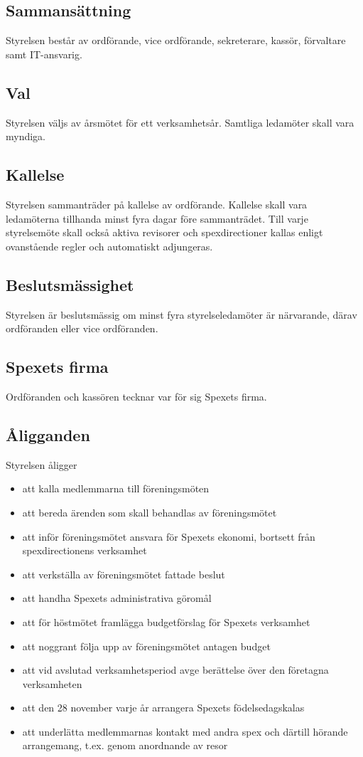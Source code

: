 \documentclass[a4paper]{article}
\begin{document}
\subsection{Sammansättning}
Styrelsen består av ordförande, vice ordförande, sekreterare, kassör, förvaltare samt IT-ansvarig.

\subsection{Val}
Styrelsen väljs av årsmötet för ett verksamhetsår. Samtliga ledamöter skall vara myndiga.

\subsection{Kallelse}
Styrelsen sammanträder på kallelse av ordförande. Kallelse skall vara ledamöterna tillhanda minst fyra dagar före sammanträdet. Till varje styrelsemöte skall också aktiva revisorer och spexdirectioner kallas enligt ovanstående regler och automatiskt adjungeras.

\subsection{Beslutsmässighet}
Styrelsen är beslutsmässig om minst fyra styrelseledamöter är närvarande, därav ordföranden eller vice ordföranden.

\subsection{Spexets firma}
Ordföranden och kassören tecknar var för sig Spexets firma.

\subsection{Åligganden}
Styrelsen åligger

\begin{itemize}
  \item att kalla medlemmarna till föreningsmöten
  \item att bereda ärenden som skall behandlas av föreningsmötet
  \item att inför föreningsmötet ansvara för Spexets ekonomi, bortsett från spexdirectionens verksamhet
  \item att verkställa av föreningsmötet fattade beslut
  \item att handha Spexets administrativa göromål
  \item att för höstmötet framlägga budgetförslag för Spexets verksamhet
  \item att noggrant följa upp av föreningsmötet antagen budget
  \item att vid avslutad verksamhetsperiod avge berättelse över den företagna verksamheten
  \item att den 28 november varje år arrangera Spexets födelsedagskalas
  \item att underlätta medlemmarnas kontakt med andra spex och därtill hörande arrangemang, t.ex. genom anordnande av resor
\end{itemize}
\end{document}
